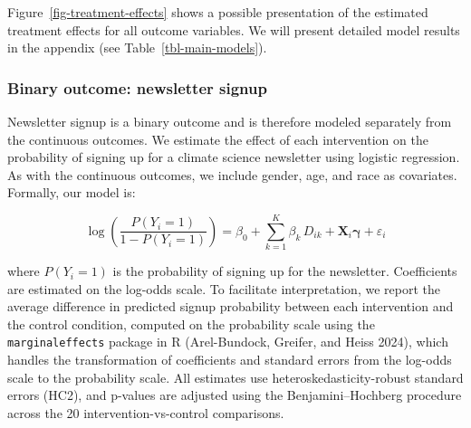 \documentclass[
  letterpaper,
  DIV=11,
  numbers=noendperiod]{scrartcl}
\begin{document}
Figure~\ref{fig-treatment-effects} shows a possible presentation of the
estimated treatment effects for all outcome variables. We will present
detailed model results in the appendix (see
Table~\ref{tbl-main-models}).

\subsubsection{Binary outcome: newsletter
signup}\label{binary-outcome-newsletter-signup}

Newsletter signup is a binary outcome and is therefore modeled
separately from the continuous outcomes. We estimate the effect of each
intervention on the probability of signing up for a climate science
newsletter using logistic regression. As with the continuous outcomes,
we include gender, age, and race as covariates. Formally, our model is:

\[\log \left( \frac{P(Y_i = 1)}{1 - P(Y_i = 1)} \right) = \beta_0 + \sum_{k=1}^{K} \beta_k \, D_{ik} + \mathbf{X}_i \boldsymbol{\gamma} + \varepsilon_i\]

where \(P(Y_i = 1)\) is the probability of signing up for the
newsletter. Coefficients are estimated on the log-odds scale. To
facilitate interpretation, we report the average difference in predicted
signup probability between each intervention and the control condition,
computed on the probability scale using the \texttt{marginaleffects}
package in R (Arel-Bundock, Greifer, and Heiss 2024), which handles the
transformation of coefficients and standard errors from the log-odds
scale to the probability scale. All estimates use
heteroskedasticity-robust standard errors (HC2), and p-values are
adjusted using the Benjamini--Hochberg procedure across the 20
intervention-vs-control comparisons.
\end{document}
